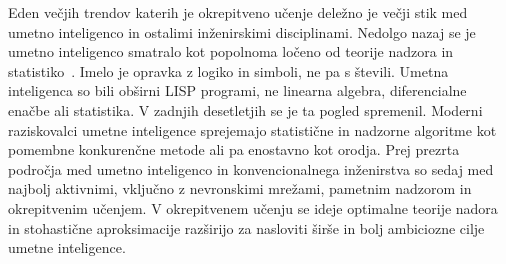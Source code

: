 \documentclass[a4paper, oneside, 12pt]{report}
\begin{document}
Eden večjih trendov katerih je okrepitveno učenje deležno je večji stik med umetno inteligenco in ostalimi inženirskimi disciplinami. Nedolgo nazaj se je umetno inteligenco smatralo kot popolnoma ločeno od teorije nadzora in statistiko~\cite{ReinforcementLearningAnIntroduction}. Imelo je opravka z logiko in simboli, ne pa s števili. Umetna inteligenca so bili obširni LISP programi, ne linearna algebra, diferencialne enačbe ali statistika. V zadnjih desetletjih se je ta pogled spremenil. Moderni raziskovalci umetne inteligence sprejemajo statistične in nadzorne algoritme kot pomembne konkurenčne metode ali pa enostavno kot orodja. Prej prezrta področja med umetno inteligenco in konvencionalnega inženirstva so sedaj med najbolj aktivnimi, vključno z nevronskimi mrežami, pametnim nadzorom in okrepitvenim učenjem. V okrepitvenem učenju se ideje optimalne teorije nadora in stohastične aproksimacije razširijo za nasloviti širše in bolj ambiciozne cilje umetne inteligence.

\end{document}

